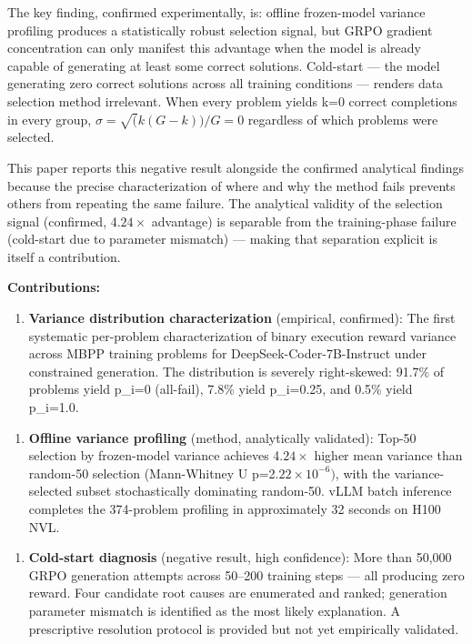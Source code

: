 The key finding, confirmed experimentally, is: offline frozen-model variance profiling produces a statistically robust selection signal, but GRPO gradient concentration can only manifest this advantage when the model is already capable of generating at least some correct solutions. Cold-start --- the model generating zero correct solutions across all training conditions --- renders data selection method irrelevant. When every problem yields k=0 correct completions in every group, $\sigma =\sqrt(k(G-k))/G=0$ regardless of which problems were selected.

This paper reports this negative result alongside the confirmed analytical findings because the precise characterization of where and why the method fails prevents others from repeating the same failure. The analytical validity of the selection signal (confirmed, 4.$24\times$ advantage) is separable from the training-phase failure (cold-start due to parameter mismatch) --- making that separation explicit is itself a contribution.

\textbf{Contributions:}

\begin{enumerate}
\item \textbf{Variance distribution characterization} (empirical, confirmed): The first systematic per-problem characterization of binary execution reward variance across MBPP training problems for DeepSeek-Coder-7B-Instruct under constrained generation. The distribution is severely right-skewed: 91.7\% of problems yield p\_i=0 (all-fail), 7.8\% yield p\_i=0.25, and 0.5\% yield p\_i=1.0.
\end{enumerate}

\begin{enumerate}
\item \textbf{Offline variance profiling} (method, analytically validated): Top-50 selection by frozen-model variance achieves 4.$24\times$ higher mean variance than random-50 selection (Mann-Whitney U p=2.$22\times 10^{-6})$, with the variance-selected subset stochastically dominating random-50. vLLM batch inference completes the 374-problem profiling in approximately 32 seconds on H100 NVL.
\end{enumerate}

\begin{enumerate}
\item \textbf{Cold-start diagnosis} (negative result, high confidence): More than 50,000 GRPO generation attempts across 50--200 training steps --- all producing zero reward. Four candidate root causes are enumerated and ranked; generation parameter mismatch is identified as the most likely explanation. A prescriptive resolution protocol is provided but not yet empirically validated.
\end{enumerate}

